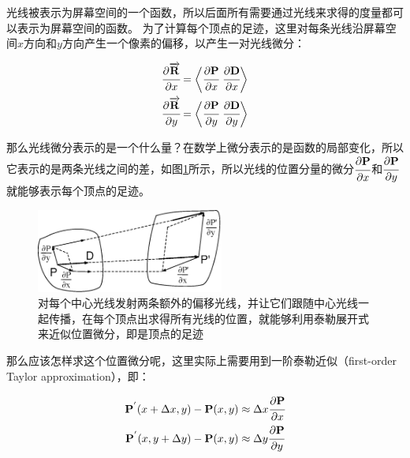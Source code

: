 光线被表示为屏幕空间的一个函数，所以后面所有需要通过光线来求得的度量都可以表示为屏幕空间的函数。 为了计算每个顶点的足迹，这里对每条光线沿屏幕空间$x$方向和$y$方向产生一个像素的偏移，以产生一对光线微分：

\begin{equation}
	\begin{aligned}
		 \cfrac{{\rm \partial}\overrightarrow{\mathbf{R}}}{{\rm \partial} x}&=\bigg\langle  \cfrac{{\rm \partial}\mathbf{P}}{{\rm \partial} x} \text{ } \cfrac{{\rm \partial}\mathbf{D}}{{\rm \partial} x}\bigg\rangle \\
		 \cfrac{{\rm \partial}\overrightarrow{\mathbf{R}}}{{\rm \partial} y}&=\bigg\langle  \cfrac{{\rm \partial}\mathbf{P}}{{\rm \partial} y} \text{ } \cfrac{{\rm \partial}\mathbf{D}}{{\rm \partial} y}\bigg\rangle
	\end{aligned}
\end{equation}

那么光线微分表示的是一个什么量？在数学上微分表示的是函数的局部变化，所以它表示的是两条光线之间的差，如图\ref{f:pt-ray-differentials}所示，所以光线的位置分量的微分$ \cfrac{{\rm \partial}\mathbf{P}}{{\rm \partial} x}$和$ \cfrac{{\rm \partial}\mathbf{P}}{{\rm \partial} y}$就能够表示每个顶点的足迹。

\begin{figure}
	\sidecaption
	\includegraphics[width=0.55\textwidth]{figures/pt/ray-differentials}
	\caption{对每个中心光线发射两条额外的偏移光线，并让它们跟随中心光线一起传播，在每个顶点出求得所有光线的位置，就能够利用泰勒展开式来近似位置微分，即是顶点的足迹}
	\label{f:pt-ray-differentials}
\end{figure}

那么应该怎样求这个位置微分呢，这里实际上需要用到一阶泰勒近似（first-order Taylor approximation），即：

\begin{equation}\label{e:pt-first-order-taylor}
	\begin{aligned}
		\mathbf{P}^{'}(x+\Delta x,y)-\mathbf{P}(x,y)& \approx\Delta x \cfrac{{\rm \partial}\mathbf{P}}{{\rm \partial} x}\\
		\mathbf{P}^{'}(x,y+\Delta y)-\mathbf{P}(x,y)& \approx\Delta y \cfrac{{\rm \partial}\mathbf{P}}{{\rm \partial} y}\\
	\end{aligned}
\end{equation}

